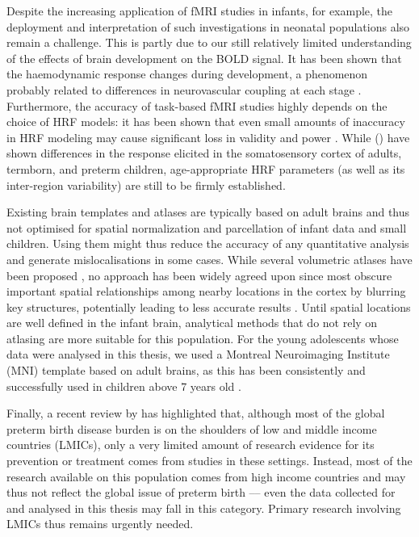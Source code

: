 Despite the increasing application of fMRI studies in infants, for example, the deployment and interpretation of such investigations in neonatal populations also remain a challenge. 
This is partly due to our still relatively limited understanding of the effects of brain development on the BOLD signal. 
It has been shown that the haemodynamic response changes during development, a phenomenon probably related to differences in neurovascular coupling at each stage \citep{Arichi2012}. 
Furthermore, the accuracy of task-based fMRI studies highly depends on the choice of HRF models: it has been shown that even small amounts of inaccuracy in HRF modeling may cause significant loss in validity and power \citep{Lindquist2007, Loh2008}. 
While \citeauthor{Arichi2012} (\citeyear{Arichi2012}) have shown differences in the response elicited in the somatosensory cortex of adults, termborn, and preterm children, age-appropriate HRF parameters (as well as its inter-region variability) are still to be firmly established.


Existing brain templates and atlases are typically based on adult brains and thus not optimised for spatial normalization and parcellation of infant data and small children.
Using them might thus reduce the accuracy of any quantitative analysis and generate mislocalisations in some cases. 
While several volumetric atlases have been proposed \citep{Habas2010, Kazemi2007, Shi2014}, no approach has been widely agreed upon since most obscure important spatial relationships among nearby locations in the cortex by blurring key structures, potentially leading to less accurate results \citep{Li2016}. 
Until spatial locations are well defined in the infant brain, analytical methods that do not rely on atlasing are more suitable for this population. For the young adolescents whose data were analysed in this thesis, we used a Montreal Neuroimaging Institute (MNI) template based on adult brains, as this has been consistently and successfully used in children above 7 years old  \citep{ASHBURNER1998, Burgund2002}. 

Finally, a recent review by \citet{Smid2016} has highlighted that, although most of the global preterm birth disease burden is on the shoulders of low and middle income countries (LMICs), only a very limited amount of research evidence for its prevention or treatment comes from studies in these settings. Instead, most of the research available on this population comes from high income countries and may thus not reflect the global issue of preterm birth --– even the data collected for and analysed in this thesis may fall in this category. Primary research involving LMICs thus remains urgently needed. 
